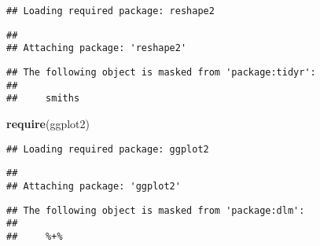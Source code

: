 \documentclass[]{ctexart}
\newenvironment{Shaded}{\begin{snugshade}}{\end{snugshade}}
\newcommand{\KeywordTok}[1]{\textcolor[rgb]{0.13,0.29,0.53}{\textbf{{#1}}}}
\newcommand{\NormalTok}[1]{{#1}}
\begin{document}
\begin{verbatim}
## Loading required package: reshape2
\end{verbatim}

\begin{verbatim}
## 
## Attaching package: 'reshape2'
\end{verbatim}

\begin{verbatim}
## The following object is masked from 'package:tidyr':
## 
##     smiths
\end{verbatim}

\begin{Shaded}
\begin{Highlighting}[]
\KeywordTok{require}\NormalTok{(ggplot2)}
\end{Highlighting}
\end{Shaded}

\begin{verbatim}
## Loading required package: ggplot2
\end{verbatim}

\begin{verbatim}
## 
## Attaching package: 'ggplot2'
\end{verbatim}

\begin{verbatim}
## The following object is masked from 'package:dlm':
## 
##     %+%
\end{verbatim}
\end{document}
